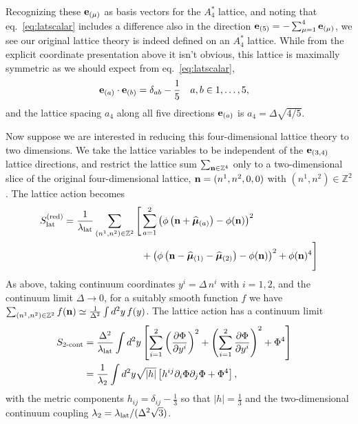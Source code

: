 Recognizing these $\mathbf{e}_{(\mu)}$ as basis vectors for the $A_4^*$ lattice, and noting that eq.~\eqref{eq:latscalar} includes a difference also in the direction $\mathbf{e}_{(5)} = -\sum_{\mu = 1}^4 \mathbf{e}_{(\mu)}$, we see our original lattice theory is indeed defined on an $A_4^*$ lattice.
While from the explicit coordinate presentation above it isn't obvious, this lattice is maximally symmetric as we should expect from eq.~\eqref{eq:latscalar},
\begin{align}
  \mathbf{e}_{(a)} \cdot \mathbf{e}_{(b)} & = \delta_{ab} - \frac{1}{5} &
  a, b & \in 1, \ldots, 5,
\end{align}
and the lattice spacing $a_4$ along all five directions $\mathbf{e}_{(a)}$ is $a_4 = \Delta \sqrt{4 / 5}$.

Now suppose we are interested in reducing this four-dimensional lattice theory to two dimensions.
We take the lattice variables to be independent of the $\mathbf{e}_{(3, 4)}$ lattice directions, and restrict the lattice sum $\sum_{\mathbf{n} \in \mathbb{Z}^4}$ only to a two-dimensional slice of the original four-dimensional lattice, $\mathbf{n} = (n^1, n^2, 0, 0)$ with $(n^1, n^2) \in \mathbb{Z}^2$.
The lattice action becomes
\begin{equation}
  \label{eq:2dLatticeAct}
  \begin{split}
    S_{\text{lat}}^{\text{(red)}} = \frac{1}{\lambda_{\text{lat}}} \sum_{(n^1, n^2) \in \mathbb{Z}^2} \Bigg[ & \sum_{a = 1}^2 \left(\phi\left(\mathbf{n} + \widehat{\boldsymbol{\mu}}_{(a)}\right) - \phi(\mathbf{n})\right)^2 \\
    & + \left(\phi\left(\mathbf{n} - \widehat{\boldsymbol{\mu}}_{(1)} - \widehat{\boldsymbol{\mu}}_{(2)}\right) - \phi(\mathbf{n})\right)^2 + \phi(\mathbf{n})^4 \Bigg]
  \end{split}
\end{equation}
As above, taking continuum coordinates $y^i = \Delta\, n^i$ with $i = 1, 2$, and the continuum limit $\Delta \to 0$, for a suitably smooth function $f$ we have $\sum_{(n^1, n^2) \in \mathbb{Z}^2} f(\mathbf{n}) \simeq \frac{1}{\Delta^2} \int d^2 y\, f(y)$.
The lattice action has a continuum limit
\begin{align}
  \label{eq:2dact1}
  S_{\text{2-cont}} & = \frac{\Delta^2}{\lambda_{\text{lat}}} \int d^2 y \left[\sum_{i = 1}^2 \left(\frac{\partial \Phi}{\partial y^i}\right)^2 + \left(\sum_{i = 1}^2 \frac{\partial \Phi}{\partial y^i}\right)^2 + \Phi^4 \right] \cr
                    & = \frac{1}{\lambda_2} \int d^2 y \sqrt{|h|} \left[h^{ij} \partial_i \Phi \partial_j \Phi + \Phi^4 \right],
\end{align}
with the metric components $h_{ij} = \delta_{ij} - \frac{1}{3}$ so that $|h| = \frac{1}{3}$ and the two-dimensional continuum coupling $\lambda_2 = \lambda_{\text{lat}} / (\Delta^2 \sqrt{3})$.
